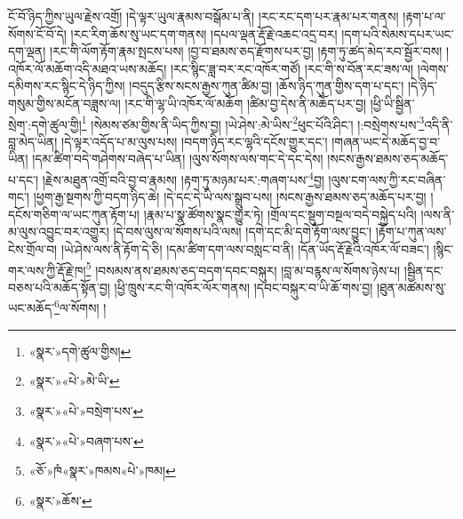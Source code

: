 ངོ་བོ་ཉིད་ཀྱིས་ཡུལ་རྗེས་འགྲོ། །དེ་ལྟར་ཡུལ་རྣམས་བསྒོམ་པ་ནི། །རང་རང་དག་པར་རྣམ་པར་གནས། །རྟག་པ་ལ་སོགས་ངོ་བོ་དེ། །རང་རིག་ཆོས་སུ་ཡང་དག་གནས། །དཔལ་ལྡན་རྡོ་རྗེ་འཆང་འདྲ་བར། །དག་པའི་སེམས་དཔར་ཡང་དག་ལྡན། །རང་གི་ལོག་རྟོག་རྣམ་སྤངས་པས། །བྱ་བ་ཐམས་ཅད་རྫོགས་པར་བྱ། །རྟག་ཏུ་ཚད་མེད་རབ་སྦྱོར་བས། །འཁོར་ལོ་མཆོག་འདི་མཐའ་ཡས་མཆོད། །རང་སྙིང་ཟླ་བར་རང་འཁོར་གཙོ། །རང་གི་ས་བོན་རང་ཟས་ལ། །ལེགས་དམིགས་རང་སྙིང་དེ་ཉིད་ཀྱིས། །བདུད་རྩིས་སངས་རྒྱས་ཀུན་ཚིམ་བྱ། །ཆོས་ཉིད་ཀུན་གྱིས་དག་པ་དང་། །དེ་ཉིད་གསུམ་གྱིས་མངོན་བཟླས་ལ། །རང་གི་ལྷ་ཡི་འཁོར་ལོ་མཆོག །ཚིམ་བྱ་དེས་ནི་མཆོད་པར་བྱ། །ཕྱི་ཡི་སྦྱིན་སྲེག་:དགེ་ཚུལ་གྱི།\footnote{«སྣར་»དགེ་ཚུལ་གྱིས།} །སེམས་ཙམ་གྱིས་ནི་ཡིད་ཀྱིས་བྱ། །ཡེ་ཤེས་:མེ་ཡིས་\footnote{«སྣར་»«པེ་»མེ་ཡི་}ཕུང་པོའི་ཤིང་། །:བསྲེགས་པས་\footnote{«སྣར་»«པེ་»བསྲེག་པས་}འདི་ནི་བླ་མེད་ཡིན། །དེ་ལྟར་འདོད་པ་མ་ལུས་པས། །བདག་ཉིད་རང་ལྷའི་དངོས་གྱུར་དང་། །གཞན་ཡང་དེ་མཆོད་བྱ་བ་ཡིན། །དམ་ཚིག་བདེ་གཤེགས་བཞེད་པ་ཡིན། །ལུས་སོགས་ལས་གང་དེ་དང་དེས། །སངས་རྒྱས་ཐམས་ཅད་མཆོད་པ་དང་། །རྗེས་མཐུན་འགྲོ་བའི་བྱ་བ་རྣམས། །རྟག་ཏུ་མཉམ་པར་:གཞག་པས་\footnote{«སྣར་»«པེ་»བཞག་པས་}བྱ། །ལུས་ངག་ལས་ཀྱི་རང་བཞིན་གང་། །ཕྱག་རྒྱ་སྔགས་ཀྱི་བདག་ཉིད་ཆེ། །དེ་དང་དེ་ཡི་ལས་སྒྲུབ་པས། །སངས་རྒྱས་ཐམས་ཅད་མཆོད་པར་བྱ། །དངོས་གཅིག་ལ་ཡང་ཀུན་རྟོག་པ། །རྣམ་པ་སྣ་ཚོགས་སྣང་གྱུར་ཏེ། །གྲོལ་དང་སྡུག་བསྔལ་བདེ་བསྐྱེད་པའི། །ལས་ནི་མ་ལུས་འབྱུང་བར་འགྱུར། །དེ་བས་ལུས་ལ་སོགས་པའི་ལས། །དགེ་དང་མི་དགེ་རྟོག་ལས་བྱུང་། །རྟོག་པ་ཀུན་ལས་ངེས་གྲོལ་བ། །ཡེ་ཤེས་ལས་ནི་རྟོག་དེ་ཅི། །དམ་ཚིག་དག་ལས་བསླང་བ་ནི། །དོན་ཡོད་རྡོ་རྗེའི་འཁོར་ལོ་བཟང་། །སྙིང་གར་ལས་ཀྱི་རྡོ་རྗེ་ཁ།\footnote{«ཅོ་»ཁཾ«སྣར་»ཁམས«པེ་»ཁམ།} །བསམས་ནས་ཐམས་ཅད་བདག་དབང་བསྐུར། །བླ་མ་བརྙས་ལ་སོགས་ཉེས་པ། །སྦྱིན་དང་བཅས་པའི་མཆོད་སྟོན་བྱ། །ཕྱི་ཁྲུས་རང་གི་འཁོར་ལོར་གནས། །དབང་བསྐུར་བ་ཡི་ཆོ་གས་བྱ། །ཐུན་མཚམས་སུ་ཡང་མཆོད་\footnote{«སྣར་»ཆོས་}ལ་སོགས། །
